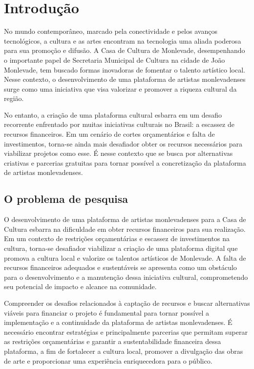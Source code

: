 \chapter{Introdução}
\label{cap:introducao}

No mundo contemporâneo, marcado pela conectividade e pelos avanços tecnológicos, a cultura e as artes encontram na tecnologia uma aliada poderosa para sua promoção e difusão. A Casa de Cultura de Monlevade, desempenhando o importante papel de Secretaria Municipal de Cultura na cidade de João Monlevade, tem buscado formas inovadoras de fomentar o talento artístico local. Nesse contexto, o desenvolvimento de uma plataforma de artistas monlevadenses surge como uma iniciativa que visa valorizar e promover a riqueza cultural da região.

No entanto, a criação de uma plataforma cultural esbarra em um desafio recorrente enfrentado por muitas iniciativas culturais no Brasil: a escassez de recursos financeiros. Em um cenário de cortes orçamentários e falta de investimentos, torna-se ainda mais desafiador obter os recursos necessários para viabilizar projetos como esse. É nesse contexto que se busca por alternativas criativas e parcerias gratuitas para tornar possível a concretização da plataforma de artistas monlevadenses.

\section{O problema de pesquisa}
\label{sec:problema}

O desenvolvimento de uma plataforma de artistas monlevadenses para a Casa de Cultura esbarra na dificuldade em obter recursos financeiros para sua realização. Em um contexto de restrições orçamentárias e escassez de investimentos na cultura, torna-se desafiador viabilizar a criação de uma plataforma digital que promova a cultura local e valorize os talentos artísticos de Monlevade. A falta de recursos financeiros adequados e sustentáveis se apresenta como um obstáculo para o desenvolvimento e a manutenção dessa iniciativa cultural, comprometendo seu potencial de impacto e alcance na comunidade.

Compreender os desafios relacionados à captação de recursos e buscar alternativas viáveis para financiar o projeto é fundamental para tornar possível a implementação e a continuidade da plataforma de artistas monlevadenses. É necessário encontrar estratégias e principalmente parcerias que permitam superar as restrições orçamentárias e garantir a sustentabilidade financeira dessa plataforma, a fim de fortalecer a cultura local, promover a divulgação das obras de arte e proporcionar uma experiência enriquecedora para o público.

